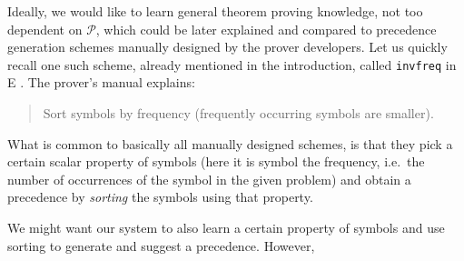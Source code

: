 Ideally, we would like to learn general theorem proving knowledge, not too dependent on $\mathcal{P}$,
which could be later explained and compared to precedence generation schemes manually designed 
by the prover developers. Let us quickly recall one such scheme, already mentioned in the introduction,
called \texttt{invfreq} in E \cite{SCV:CADE-2019}. The prover's manual \cite{E-manual} explains:
\begin{quote}
Sort symbols by frequency (frequently occurring symbols are smaller).
\end{quote}
What is common to basically all manually designed schemes, is that they pick a certain scalar property of symbols 
(here it is symbol the frequency, i.e.~the number of occurrences of the symbol in the given problem)
and obtain a precedence by \emph{sorting} the symbols using that property.


\newpage


% 









We might want our system to also learn a certain property of symbols and use sorting to generate and suggest a precedence. However, 



















